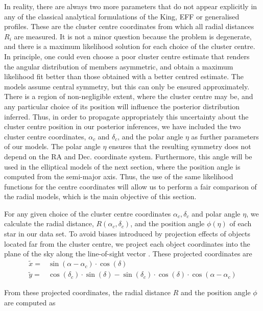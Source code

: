 In reality, there are always two more parameters that do not appear explicitly in any of the classical analytical formulations of the King, EFF or generalised profiles. These are the cluster centre coordinates from which all radial distances $R_i$ are measured. It is not a minor question because the problem is degenerate, and there is a maximum likelihood solution for each choice of the cluster centre. In principle, one could even choose a poor cluster centre estimate that renders the angular distribution of members asymmetric, and obtain a maximum likelihood fit better than those obtained with a better centred estimate.  The models assume central symmetry, but this can only be ensured approximately. There is a region of non-negligible extent, where the cluster centre may be, and any particular choice of its position will influence the posterior distribution inferred. Thus, in order to propagate appropriately this uncertainty about the cluster centre position in our posterior inferences, we have included the two cluster centre coordinates, $\alpha_c$ and $\delta_c$, and the polar angle $\eta$ as further parameters of our models. The polar angle $\eta$ ensures that the resulting symmetry does not depend on the RA and Dec. coordinate system. Furthermore, this angle will be used in the elliptical models of the next section, where the position angle is computed from the semi-major axis. Thus, the use of the same likelihood functions for the centre coordinates will allow us to perform a fair comparison of the radial models, which is the main objective of this section.

For any given choice of the cluster centre coordinates $\alpha_c,\delta_c$ and polar angle $\eta$, we calculate the radial distance, $R(\alpha_c,\delta_c)$, and the position angle $\phi(\eta)$ of each star in our data set. To avoid biases introduced by projection effects of objects located far from the cluster centre, we project each object coordinates into the plane of the sky along the line-of-sight vector \cite[see for example, Eq. 1 of][]{2006A&A...445..513V}. These projected coordinates are
\begin{align}
\tilde{x} =&\sin(\alpha - \alpha_c ) \cdot \cos(\delta)\nonumber\\
\tilde{y} = &\cos(\delta_c)\cdot \sin(\delta) - \sin(\delta_c)\cdot \cos(\delta)\cdot\cos(\alpha - \alpha_c)
\end{align}

From these projected coordinates, the radial distance $R$ and the position angle $\phi$ are computed as 

